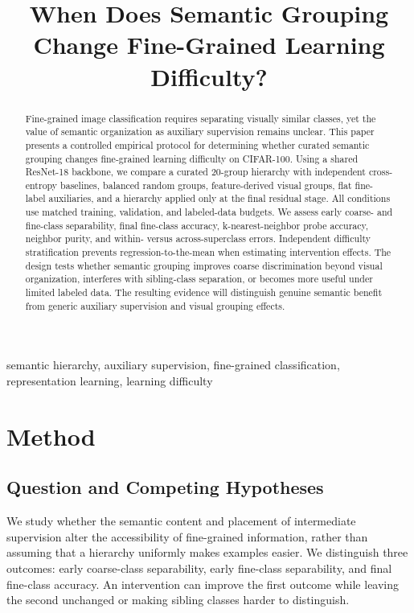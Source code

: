 \documentclass[conference]{IEEEtran}
\begin{document}
\title{When Does Semantic Grouping Change Fine-Grained Learning Difficulty?}
\author{}
\maketitle

\begin{abstract}
Fine-grained image classification requires separating visually similar classes, yet the value of semantic organization as auxiliary supervision remains unclear. This paper presents a controlled empirical protocol for determining whether curated semantic grouping changes fine-grained learning difficulty on CIFAR-100. Using a shared ResNet-18 backbone, we compare a curated 20-group hierarchy with independent cross-entropy baselines, balanced random groups, feature-derived visual groups, flat fine-label auxiliaries, and a hierarchy applied only at the final residual stage. All conditions use matched training, validation, and labeled-data budgets. We assess early coarse- and fine-class separability, final fine-class accuracy, k-nearest-neighbor probe accuracy, neighbor purity, and within- versus across-superclass errors. Independent difficulty stratification prevents regression-to-the-mean when estimating intervention effects. The design tests whether semantic grouping improves coarse discrimination beyond visual organization, interferes with sibling-class separation, or becomes more useful under limited labeled data. The resulting evidence will distinguish genuine semantic benefit from generic auxiliary supervision and visual grouping effects.
\end{abstract}

\begin{IEEEkeywords}
semantic hierarchy, auxiliary supervision, fine-grained classification, representation learning, learning difficulty
\end{IEEEkeywords}

\section{Method}
\label{sec:method}

\subsection{Question and Competing Hypotheses}
We study whether the semantic content and placement of intermediate supervision alter the accessibility of fine-grained information, rather than assuming that a hierarchy uniformly makes examples easier. We distinguish three outcomes: early coarse-class separability, early fine-class separability, and final fine-class accuracy. An intervention can improve the first outcome while leaving the second unchanged or making sibling classes harder to distinguish.
\end{document}
